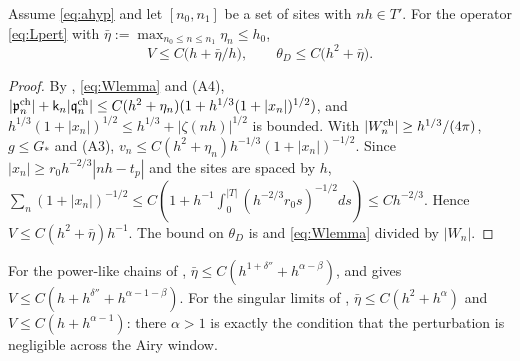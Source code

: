 \begin{lemma}[Size of $V$]\label{lem:V}
Assume \eqref{eq:ahyp} and let $[n_0,n_1]$ be a set of sites with $nh\in T'$. For the
operator \eqref{eq:Lpert} with $\bar\eta:=\max_{n_0\le n\le n_1}\eta_n\le h_0$,
\[
  V\le C\bigl(h+\bar\eta/h\bigr),\qquad\theta_D\le C\bigl(h^2+\bar\eta\bigr).
\]
\end{lemma}

\begin{proof}
By , \eqref{eq:Wlemma} and (A4),
$|\mathfrak{p}^{\rm ch}_n|+\mathsf k_n|\mathfrak{q}^{\rm ch}_n|\le C(h^2+\eta_n)(1+h^{1/3}(1+|x_n|)^{1/2})$, and
$h^{1/3}(1+|x_n|)^{1/2}\le h^{1/3}+|\zeta(nh)|^{1/2}$ is bounded. With $|W^{\rm ch}_n|\ge h^{1/3}/(4\pi)$,
$g\le G_*$ and (A3),
$v_n\le C(h^2+\eta_n)h^{-1/3}(1+|x_n|)^{-1/2}$. Since $|x_n|\ge r_0h^{-2/3}|nh-t_p|$ and the sites
are spaced by $h$, $\sum_n(1+|x_n|)^{-1/2}\le C(1+h^{-1}\int_0^{|T|}(h^{-2/3}r_0s)^{-1/2}ds)\le Ch^{-2/3}$.
Hence $V\le C(h^2+\bar\eta)h^{-1}$. The bound on $\theta_D$ is  and \eqref{eq:Wlemma}
divided by $|W_n|$.
\end{proof}

For the power-like chains of , $\bar\eta\le C(h^{1+\delta''}+h^{\alpha-\beta})$, and
 gives $V\le C(h+h^{\delta''}+h^{\alpha-1-\beta})$. For the singular limits of
, $\bar\eta\le C(h^2+h^\alpha)$ and $V\le C(h+h^{\alpha-1})$: there $\alpha>1$ is
exactly the condition that the perturbation is negligible across the Airy window.
